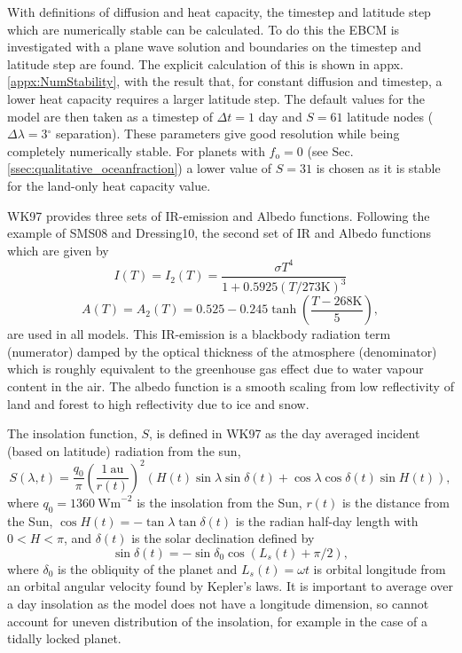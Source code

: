 \documentclass[12pt, onecolumn]{revtex4-2}    %
\newcommand{\degrees}{\ensuremath{^{\circ}}}
\begin{document}
With definitions of diffusion and heat capacity, the timestep and latitude step which are numerically stable can be calculated.
To do this the EBCM is investigated with a plane wave solution and boundaries on the timestep and latitude step are found.
The explicit calculation of this is shown in appx. \ref{appx:NumStability}, with the result that, for constant diffusion and timestep, a lower heat capacity requires a larger latitude step.
The default values for the model are then taken as a timestep of $\Delta t = 1$ day and $S = 61$ latitude nodes ($\Delta \lambda = 3\degrees$ separation).
These parameters give good resolution while being completely numerically stable.
For planets with $f_\text{o} = 0$ (see Sec. \ref{ssec:qualitative_oceanfraction}) a lower value of $S=31$ is chosen as it is stable for the land-only heat capacity value.

WK97 provides three sets of IR-emission and Albedo functions. Following the example of SMS08 and Dressing10, the second set of IR and Albedo functions which are given by
\begin{equation}
  I(T) = I_2(T) = \frac{\sigma T^4}{1 + 0.5925 (T / 273 \text{K}) ^ 3}
\end{equation}
\begin{equation}
  A(T) = A_2(T) = 0.525 - 0.245 \tanh\left(\frac{T - 268 \text{K}}{5}\right),
\end{equation}
are used in all models.
This IR-emission is a blackbody radiation term (numerator) damped by the optical thickness of the atmosphere (denominator) which is roughly equivalent to the greenhouse gas effect due to water vapour content in the air.
The albedo function is a smooth scaling from low reflectivity of land and forest to high reflectivity due to ice and snow.

The insolation function, $S$, is defined in WK97 as the day averaged incident (based on latitude) radiation from the sun,
\begin{equation}
  S(\lambda, t) = \frac{q_0}{\pi} \left(\frac{1 \ \text{au}}{r(t)}\right)^2 (H(t) \sin{\lambda} \sin{\delta(t)} + \cos{\lambda} \cos{\delta(t)} \sin{H(t)}),
  \label{eq:diurnally_averaged_insolation}
\end{equation}
where $q_0=1360 \ \text{Wm}^{-2}$ is the insolation from the Sun,
$r(t)$ is the distance from the Sun,
$\cos H(t) = -\tan \lambda \tan \delta(t)$ is the radian half-day length with $0 < H < \pi$,
and $\delta(t)$ is the solar declination defined by
\begin{equation}
  \sin \delta(t) = -\sin \delta_0 \cos(L_s(t) + \pi/2),
  \label{eq:solar_declination}
\end{equation}
where $\delta_0$ is the obliquity of the planet and $L_s(t) = \omega t$ is orbital longitude from an orbital angular velocity found by Kepler's laws.
It is important to average over a day insolation as the model does not have a longitude dimension, so cannot account for uneven distribution of the insolation, for example in the case of a tidally locked planet.
\end{document}
